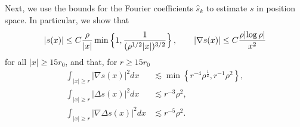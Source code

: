 \documentclass[a4paper,11pt]{article}
\numberwithin{equation}{section}
\begin{document}
Next, we use the bounds for the Fourier coefficients $\widehat{s}_k$ to estimate $s$ in position space. In particular, we show that 
\begin{equation}\label{eq:s-point} | s (x)| \leq C \frac{\rho}{|x|} \min \Big\{ 1 , \frac{1}{(\rho^{1/2} |x|)^{3/2}} \Big\} \,, \qquad |\nabla s (x)| \leq C \frac{\rho |\hspace{-.05cm} \log \rho |}{x^2} \end{equation} 
for all $|x| \geq  15 r_0$, and that, for $r\geq 15r_0$
\begin{equation}\label{eq:int-s}\begin{split} 
    \int_{|x|\geq r}  |\nabla s(x)|^2dx  &\lesssim \min\left\{r^{-4}\rho^{\frac{1}{2}},r^{-1}\rho^2\right\},\\
       \int_{|x|\geq r}   \left|\Delta s (x) \right|^2dx& \lesssim   r^{-3}\rho^2,\\
     \int_{|x|\geq r}  \left|\nabla \Delta s (x) \right|^2dx& \lesssim   r^{-5}\rho^2.
     \end{split} 
\end{equation}
\end{document}
